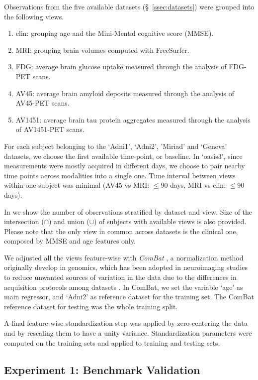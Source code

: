Observations from the five available datasets (\S~\ref{ssec:datasets}) were grouped into the following views.
\begin{enumerate}
\item clin: grouping age and the Mini-Mental cognitive score (MMSE).
\item MRI: grouping brain volumes computed with FreeSurfer.
\item FDG: average brain glucose uptake measured through the analysis of FDG-PET scans.
\item AV45: average brain amyloid deposits measured through the analysis of AV45-PET scans.
\item AV1451: average brain tau protein aggregates measured through the analysis of AV1451-PET scans.
\end{enumerate}

For each subject belonging to the `Adni1', `Adni2', 'Miriad' and `Geneva' datasets, we choose the first available time-point, or baseline.
In `oasis3', since measurements were mostly acquired in different days, we choose to pair nearby time points across modalities into a single one.
Time interval between views within one subject was minimal (AV45 vs MRI: $\leq 90$ days, MRI vs clin: $\leq 90$ days).

In  we show the number of observations stratified by dataset and view.
Size of the intersection ($\cap$) and union ($\cup$) of subjects with available views is also provided.
Please note that the only view in common across datasets is the clinical one, composed by MMSE and age features only.

We adjusted all the views feature-wise with \textit{ComBat} \citep{combat}, a normalization method originally develop in genomics, which has been adopted in neuroimaging studies to reduce unwanted sources of variation in the data due to the differences in acquisition protocols among datasets \citep{Fortin2017, Fortin2018, Orlhac2020}.
In ComBat, we set the variable `age' as main regressor, and `Adni2' as reference dataset for the training set.
The ComBat reference dataset for testing was the whole training split.

A final feature-wise standardization step was applied by zero centering the data and by rescaling them to have a unity variance.
Standardization parameters were computed on the training sets and applied to training and testing sets.

\subsection{Experiment 1: Benchmark Validation}


